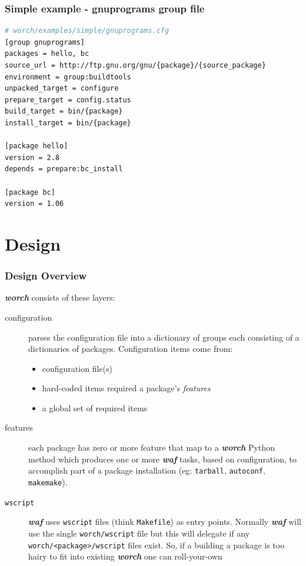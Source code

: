 \documentclass[xcolor=dvipsnames]{beamer}
\newcommand{\app}[1]{\textbf{\textit{#1}}\xspace}
\def\waf{\app{waf}}
\def\worch{\app{worch}}
\begin{document}
\begin{frame}[fragile]
  \frametitle{Simple example - gnuprograms group file}
    \begin{lstlisting}[language=bash,emph={start,keytype}]
# worch/examples/simple/gnuprograms.cfg
[group gnuprograms]
packages = hello, bc
source_url = http://ftp.gnu.org/gnu/{package}/{source_package}
environment = group:buildtools
unpacked_target = configure
prepare_target = config.status
build_target = bin/{package}
install_target = bin/{package}

[package hello]
version = 2.8
depends = prepare:bc_install

[package bc]
version = 1.06 
    \end{lstlisting}
\end{frame}

\section{Design}

\begin{frame}[fragile]
  \frametitle{Design Overview}
  \worch consists of these layers:
  \begin{description}
  \item[configuration] parses the configuration file into a dictionary
    of groups each consisting of a dictionaries of packages.
    Configuration items come from:
    \begin{itemize}
    \item configuration file(s) 
    \item hard-coded items required a package's \textit{features}
    \item a global set of required items
    \end{itemize}
  \item[features] each package has zero or more feature that map to a
    \worch Python method which produces one or more \waf tasks, based
    on configuration, to accomplish part of a package installation
    (eg: \texttt{tarball}, \texttt{autoconf}, \texttt{makemake}).
  \item[\texttt{wscript}] \waf uses \texttt{wscript} files (think
    \texttt{Makefile}) as entry points.  Normally \waf will use the
    single \texttt{worch/wscript} file but this will delegate if any
    \verb|worch/<package>/wscript| files exist.  So, if a building a
    package is too hairy to fit into existing \worch one can
    roll-your-own
  \end{description}
\end{frame}
\end{document}
